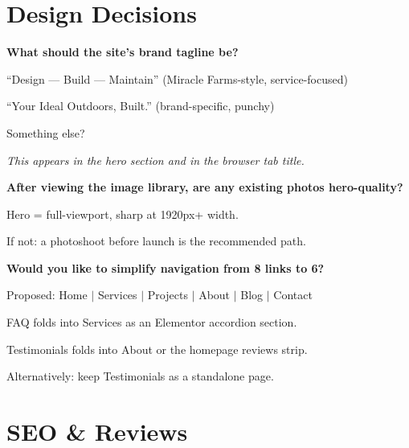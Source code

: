 \documentclass[11pt, letterpaper]{article}
\begin{document}
\section{Design Decisions}

\begin{checklist}
  \item \textbf{What should the site's brand tagline be?}
    \begin{checklist}
      \item ``Design --- Build --- Maintain'' \quad (Miracle Farms-style, service-focused)
      \item ``Your Ideal Outdoors, Built.'' \quad (brand-specific, punchy)
      \item Something else?
    \end{checklist}
    \textit{\small This appears in the hero section and in the browser tab title.}

  \item \textbf{After viewing the image library, are any existing photos
        hero-quality?}
    \begin{checklist}
      \item Hero = full-viewport, sharp at 1920px+ width.
      \item If not: a photoshoot before launch is the recommended path.
    \end{checklist}

  \item \textbf{Would you like to simplify navigation from 8 links to 6?}
    \begin{checklist}
      \item Proposed: Home $|$ Services $|$ Projects $|$ About $|$ Blog $|$ Contact
      \item FAQ folds into Services as an Elementor accordion section.
      \item Testimonials folds into About or the homepage reviews strip.
      \item Alternatively: keep Testimonials as a standalone page.
    \end{checklist}
\end{checklist}

\section{SEO \& Reviews}
\end{document}
